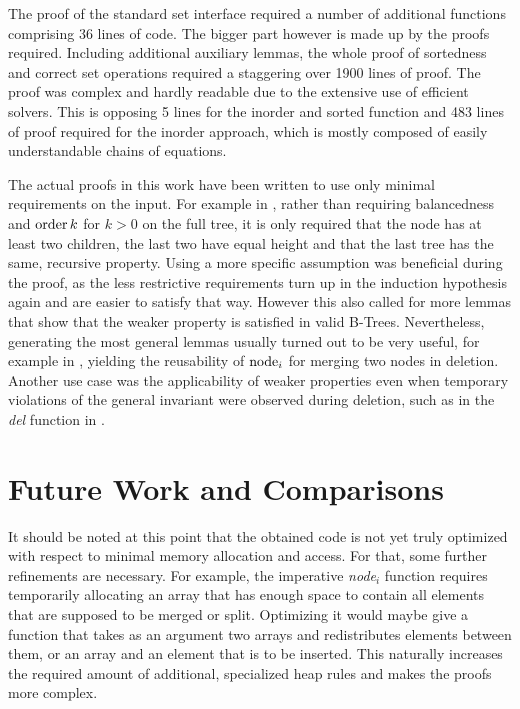 The proof of the standard set interface required a number of additional functions
comprising 36 lines of code.
The bigger part however is made up by the proofs required.
Including additional auxiliary lemmas, the whole proof of sortedness
and correct set operations required a staggering over 1900 lines of proof.
The proof was complex and hardly readable due to the 
extensive use of efficient solvers.
This is opposing 5 lines for the inorder and sorted function and
483 lines of proof required for the inorder approach,
which is mostly composed of easily understandable chains of equations.


The actual proofs in this work have been written to use only
minimal requirements on the input.
For example in , rather than
requiring balancedness and $\operatorname{order} k$ for $k > 0$ on the full tree,
it is only required that the node has at least two children,
the last two have equal height
and that the last tree has the same, recursive property.
Using a more specific assumption was beneficial during the proof,
as the less restrictive requirements turn up in the
induction hypothesis again and are easier to satisfy that way.
However this also called for more lemmas that show that
the weaker property is satisfied in valid B-Trees.
Nevertheless, generating the most general lemmas usually turned out to be
very useful, for example in , yielding the reusability of $\operatorname{node}_i$ for
merging two nodes in deletion.
Another use case was the applicability of weaker properties
even when temporary violations
of the general invariant were observed during deletion,
such as in the \textit{del} function in .

\section{Future Work and Comparisons}

It should be noted at this point that the obtained code is not yet
truly optimized with respect to minimal memory allocation and access.
For that, some further refinements are necessary.
For example, the imperative \textit{node$_i$} function
requires temporarily allocating
an array that has enough space to contain
all elements that are supposed to be merged or split.
Optimizing it would maybe give a function that takes
as an argument two arrays and redistributes elements between them,
or an array and an element that is to be inserted.
This naturally increases the required amount of additional,
specialized heap rules and makes the proofs more complex.


